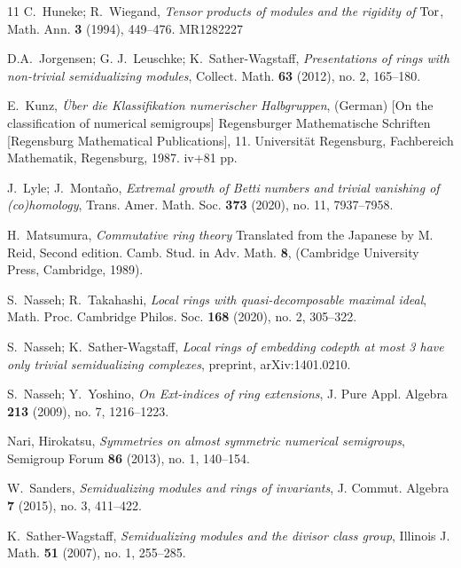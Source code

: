 \documentclass{amsart}
\theoremstyle{plain}
\theoremstyle{definition}
\numberwithin{theorem}{section}
\numberwithin{equation}{section}
\numberwithin{equation}{theorem}
\begin{document}
\begin{thebibliography}{11}
 C.~Huneke; R.~Wiegand, \emph{Tensor products of modules and the rigidity of {${\rm Tor}$}}, Math. Ann. {\bf 3} (1994), 449--476. MR{1282227} %

D.A.~Jorgensen; G. J.~Leuschke; K.~Sather-Wagstaff,  \emph{Presentations of rings with non-trivial semidualizing modules}, Collect. Math. {\bf 63} (2012), no. 2, 165--180. %

E.~Kunz, \emph{\"Uber die Klassifikation numerischer Halbgruppen}, (German) [On the classification of numerical semigroups] Regensburger Mathematische Schriften [Regensburg Mathematical Publications], 11. Universit\"at Regensburg, Fachbereich Mathematik, Regensburg, 1987. {\rm iv}+81 pp. %

J.~Lyle; J.~Monta\~{n}o, \emph{Extremal growth of Betti numbers and trivial vanishing of (co)homology}, Trans. Amer. Math. Soc. {\bf 373} (2020), no. 11, 7937--7958. %

H.~Matsumura, \emph{Commutative ring theory} Translated from the Japanese by M. Reid, Second edition.
Camb. Stud. in Adv. Math. {\bf 8}, (Cambridge University Press, Cambridge, 1989).

S.~Nasseh; R.~Takahashi, \emph{Local rings with quasi-decomposable maximal ideal}, Math. Proc. Cambridge Philos. Soc. {\bf 168} (2020), no. 2, 305--322. %

S.~Nasseh; K.~Sather-Wagstaff, \emph{
Local rings of embedding codepth at most 3 have only trivial semidualizing complexes}, preprint, arXiv:1401.0210.

S.~Nasseh; Y.~Yoshino, \emph{On Ext-indices of ring extensions}, J. Pure Appl. Algebra {\bf 213} (2009), no. 7, 1216--1223. %

Nari, Hirokatsu, \emph{Symmetries on almost symmetric numerical semigroups}, Semigroup Forum {\bf 86} (2013), no. 1, 140--154. %


 W.~Sanders, \emph{Semidualizing modules and rings of invariants}, J. Commut. Algebra \textbf{7} (2015), no. 3, 411--422. %

K.~Sather-Wagstaff, \emph{Semidualizing modules and the divisor class group}, Illinois J. Math. {\bf 51} (2007), no. 1, 255--285.


\end{thebibliography}
\end{document}
